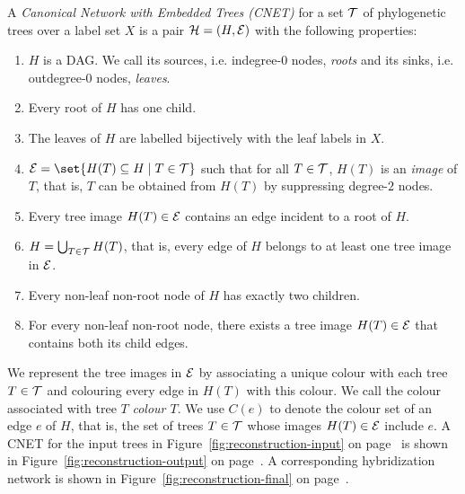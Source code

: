A \emph{Canonical Network with Embedded Trees (CNET)} for a set $\mathcal{T}$ of phylogenetic trees over a label set $X$ is a pair $\mathcal{H} = (H, \mathcal{E})$ with the following properties:
\begin{enumerate}%
\item $H$ is a DAG. We call its sources, i.e. indegree-0 nodes, \emph{roots} and its sinks, i.e. outdegree-0 nodes, \emph{leaves}.\label{cond:acyclic-network}
\item Every root of $H$ has one child.\label{cond:non-splitting-roots}
\item The leaves of $H$ are labelled bijectively with the leaf labels in 
  $X$.\label{cond:leaf-labelling}
\item $\E = \set{H(T) \subseteq H \mid T \in \T}$ such that for all $T \in \mathcal{T}$,
  $H(T)$ is an \emph{image} of $T$, that is, $T$ can be obtained from $H(T)$
  by suppressing degree-$2$ nodes.\label{cond:displays-trees}
\item Every tree image $H(T) \in \mathcal{E}$ contains an edge incident to a root of
  $H$.\label{cond:start-at-the-root}
\item $H = \bigcup_{T \in \mathcal{T}}H(T)$, that is, every edge of $H$ belongs to at
  least one tree image in $\mathcal{E}$.\label{cond:no-useless-edges}
\item Every {non-leaf} non-root node of $H$ has exactly two
  children.\label{cond:bifurcating-nodes}
\item For every {non-leaf} non-root node, there exists a tree image
  $H(T) \in \mathcal{E}$ that contains both its child
  edges.\label{cond:every-node-splits}
\end{enumerate}

We represent the tree images in $\mathcal{E}$ by associating a unique colour with each tree $T \in \mathcal{T}$ and colouring every edge in $H(T)$ with this colour. We call the colour associated with tree $T$ \emph{colour $T$}. We use $C(e)$ to denote the colour set of an edge $e$ of $H$, that is, the set of trees $T \in \mathcal{T}$ whose images $H(T) \in \mathcal{E}$ include $e$. A CNET for the input trees in Figure~\ref{fig:reconstruction-input} on page~\pageref{fig:reconstruction-input} is shown in Figure~\ref{fig:reconstruction-output} on page~\pageref{fig:reconstruction-output}. A corresponding hybridization network is shown in Figure~\ref{fig:reconstruction-final} on page~\pageref{fig:reconstruction-final}.

